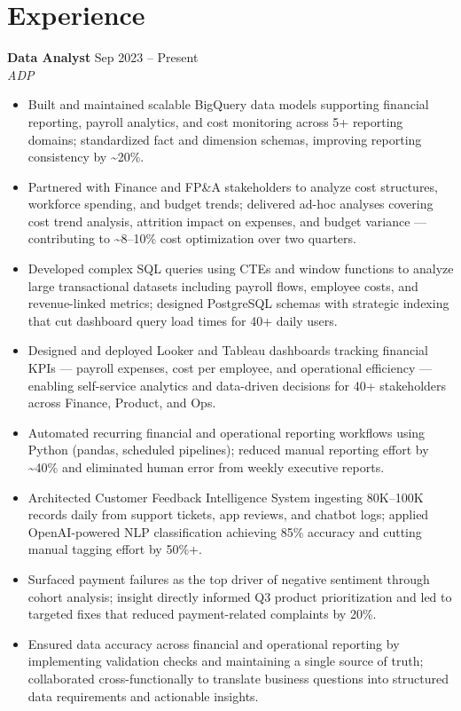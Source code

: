 \documentclass[10pt,letterpaper]{article}
\newcommand{\entry}[3]{%
  \vspace{3pt}\textbf{#1} \hfill #3 \\
  \textit{\small #2}\vspace{1pt}}
\begin{document}
\section{Experience}

\entry{Data Analyst}{ADP}{Sep 2023 -- Present}
\begin{itemize}
  \item Built and maintained scalable BigQuery data models supporting financial reporting, payroll analytics, and cost monitoring across 5+ reporting domains; standardized fact and dimension schemas, improving reporting consistency by \textasciitilde{}20\%.
  \item Partnered with Finance and FP\&A stakeholders to analyze cost structures, workforce spending, and budget trends; delivered ad-hoc analyses covering cost trend analysis, attrition impact on expenses, and budget variance --- contributing to \textasciitilde{}8--10\% cost optimization over two quarters.
  \item Developed complex SQL queries using CTEs and window functions to analyze large transactional datasets including payroll flows, employee costs, and revenue-linked metrics; designed PostgreSQL schemas with strategic indexing that cut dashboard query load times for 40+ daily users.
  \item Designed and deployed Looker and Tableau dashboards tracking financial KPIs --- payroll expenses, cost per employee, and operational efficiency --- enabling self-service analytics and data-driven decisions for 40+ stakeholders across Finance, Product, and Ops.
  \item Automated recurring financial and operational reporting workflows using Python (pandas, scheduled pipelines); reduced manual reporting effort by \textasciitilde{}40\% and eliminated human error from weekly executive reports.
  \item Architected Customer Feedback Intelligence System ingesting 80K--100K records daily from support tickets, app reviews, and chatbot logs; applied OpenAI-powered NLP classification achieving 85\% accuracy and cutting manual tagging effort by 50\%+.
  \item Surfaced payment failures as the top driver of negative sentiment through cohort analysis; insight directly informed Q3 product prioritization and led to targeted fixes that reduced payment-related complaints by 20\%.
  \item Ensured data accuracy across financial and operational reporting by implementing validation checks and maintaining a single source of truth; collaborated cross-functionally to translate business questions into structured data requirements and actionable insights.
\end{itemize}
\end{document}

